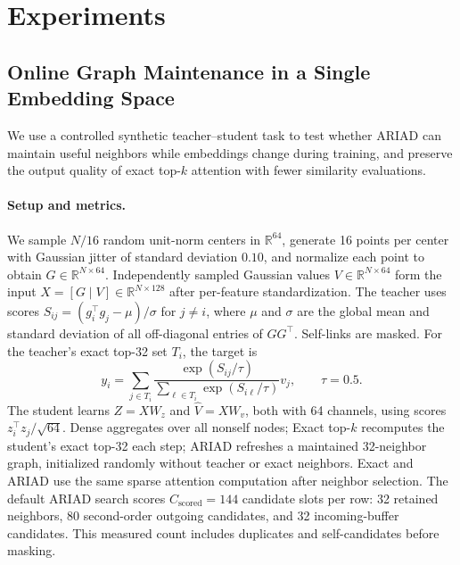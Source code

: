 \section{Experiments}
\subsection{Online Graph Maintenance in a Single Embedding Space}
\label{sec:single-space}

We use a controlled synthetic teacher--student task to test whether ARIAD can maintain useful neighbors while embeddings change during training, and preserve the output quality of exact top-$k$ attention with fewer similarity evaluations.

\paragraph{Setup and metrics.}
We sample $N/16$ random unit-norm centers in $\mathbb{R}^{64}$, generate 16 points per center with Gaussian jitter of standard deviation $0.10$, and normalize each point to obtain $G\in\mathbb{R}^{N\times64}$. Independently sampled Gaussian values $V\in\mathbb{R}^{N\times64}$ form the input $X=[G\mid V]\in\mathbb{R}^{N\times128}$ after per-feature standardization. The teacher uses scores $S_{ij}=(g_i^\top g_j-\mu)/\sigma$ for $j\ne i$, where $\mu$ and $\sigma$ are the global mean and standard deviation of all off-diagonal entries of $GG^\top$. Self-links are masked. For the teacher's exact top-32 set $T_i$, the target is
\begin{equation}
 y_i=\sum_{j\in T_i}
 \frac{\exp(S_{ij}/\tau)}{\sum_{\ell\in T_i}\exp(S_{i\ell}/\tau)}v_j,
 \qquad \tau=0.5.
\end{equation}
The student learns $Z=XW_z$ and $\hat V=XW_v$, both with 64 channels, using scores $z_i^\top z_j/\sqrt{64}$. Dense aggregates over all nonself nodes; Exact top-$k$ recomputes the student's exact top-32 each step; ARIAD refreshes a maintained 32-neighbor graph, initialized randomly without teacher or exact neighbors. Exact and ARIAD use the same sparse attention computation after neighbor selection. The default ARIAD search scores $C_{\mathrm{scored}}=144$ candidate slots per row: 32 retained neighbors, 80 second-order outgoing candidates, and 32 incoming-buffer candidates. This measured count includes duplicates and self-candidates before masking.

